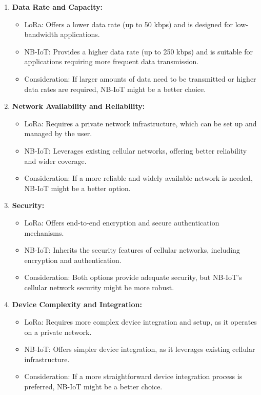 \documentclass{article}
\begin{document}
\begin{enumerate}
\begin{enumerate}
    \item \textbf{Data Rate and Capacity:}
    \begin{itemize}
        \item LoRa: Offers a lower data rate (up to 50 kbps) and is designed for low-bandwidth applications.
        \item NB-IoT: Provides a higher data rate (up to 250 kbps) and is suitable for applications requiring more frequent data transmission.
        \item Consideration: If larger amounts of data need to be transmitted or higher data rates are required, NB-IoT might be a better choice.
    \end{itemize}

    \item \textbf{Network Availability and Reliability:}
    \begin{itemize}
        \item LoRa: Requires a private network infrastructure, which can be set up and managed by the user.
        \item NB-IoT: Leverages existing cellular networks, offering better reliability and wider coverage.
        \item Consideration: If a more reliable and widely available network is needed, NB-IoT might be a better option.
    \end{itemize}

    \item \textbf{Security:}
    \begin{itemize}
        \item LoRa: Offers end-to-end encryption and secure authentication mechanisms.
        \item NB-IoT: Inherits the security features of cellular networks, including encryption and authentication.
        \item Consideration: Both options provide adequate security, but NB-IoT's cellular network security might be more robust.
    \end{itemize}

    \item \textbf{Device Complexity and Integration:}
    \begin{itemize}
        \item LoRa: Requires more complex device integration and setup, as it operates on a private network.
        \item NB-IoT: Offers simpler device integration, as it leverages existing cellular infrastructure.
        \item Consideration: If a more straightforward device integration process is preferred, NB-IoT might be a better choice.
    \end{itemize}


\end{enumerate}
\end{enumerate}
\end{document}
